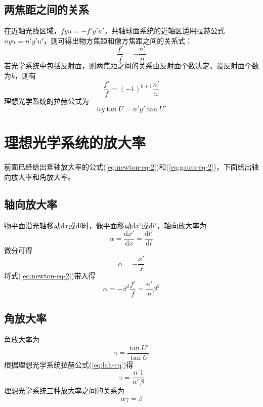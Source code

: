 \documentclass[cn,11pt]{elegantbook}
\begin{document}
\subsection{两焦距之间的关系}
在近轴光线区域，$fyu=-f'y'u'$，共轴球面系统的近轴区适用拉赫公式$nyu=n'y'u'$，则可得出物方焦距和像方焦距之间的关系式：
\begin{equation}
\frac{f'}{f}=-\frac{n'}{n}
\end{equation}
若光学系统中包括反射面，则两焦距之间的关系由反射面个数决定。设反射面个数为$k$，则有
\begin{equation}
\frac{f'}{f}=(-1)^{k+1}\frac{n'}{n}
\end{equation}
理想光学系统的拉赫公式为
\begin{equation}
ny\tan U=n'y'\tan U'
\label{eq:lah-eq}
\end{equation}

\section{理想光学系统的放大率}
前面已经给出垂轴放大率的公式(\ref{eq:newton-eq-2})和(\ref{eq:gauss-eq-2})，下面给出轴向放大率和角放大率。
\subsection{轴向放大率}
物平面沿光轴移动$\mathrm{d} x$或$\mathrm{d} l$时，像平面移动$\mathrm{d} x'$或$\mathrm{d} l'$，轴向放大率为
\begin{equation}
\alpha=\frac{\mathrm{d} x'}{\mathrm{d} x}=\frac{\mathrm{d} l'}{\mathrm{d} l}
\end{equation}
微分可得
\begin{equation}
\alpha=-\frac{x'}{x}
\end{equation}
将式(\ref{eq:newton-eq-2})带入得
\begin{equation}
\alpha=-\beta^2\frac{f'}{f}=\frac{n'}{n}\beta^2
\end{equation}

\subsection{角放大率}
角放大率为
\begin{equation}
\gamma=\frac{\tan U'}{\tan U}
\end{equation}
根据理想光学系统拉赫公式(\ref{eq:lah-eq})得
\begin{equation}
\gamma=\frac{n}{n'}\frac{1}{\beta}
\end{equation}
理想光学系统三种放大率之间的关系为
\begin{equation}
\alpha\gamma=\beta
\end{equation}
\end{document}
